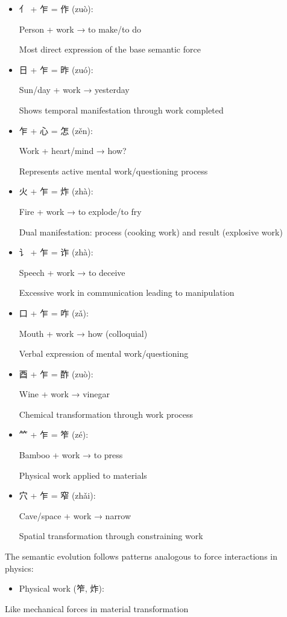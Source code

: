 \documentclass[
  11pt,
  letterpaper,
]{article}
\providecommand{\tightlist}{%
  \setlength{\itemsep}{0pt}\setlength{\parskip}{0pt}}
\begin{document}
\begin{itemize}
\item
  亻 + 乍 = 作 (zuò):

  Person + work → to make/to do

  Most direct expression of the base semantic force
\item
  日 + 乍 = 昨 (zuó):

  Sun/day + work → yesterday

  Shows temporal manifestation through work completed
\item
  乍 + 心 = 怎 (zěn):

  Work + heart/mind → how?

  Represents active mental work/questioning process
\item
  火 + 乍 = 炸 (zhà):

  Fire + work → to explode/to fry

  Dual manifestation: process (cooking work) and result (explosive work)
\item
  讠 + 乍 = 诈 (zhà):

  Speech + work → to deceive

  Excessive work in communication leading to manipulation
\item
  口 + 乍 = 咋 (zǎ):

  Mouth + work → how (colloquial)

  Verbal expression of mental work/questioning
\item
  酉 + 乍 = 酢 (zuò):

  Wine + work → vinegar

  Chemical transformation through work process
\item
  ⺮ + 乍 = 笮 (zé):

  Bamboo + work → to press

  Physical work applied to materials
\item
  穴 + 乍 = 窄 (zhǎi):

  Cave/space + work → narrow

  Spatial transformation through constraining work
\end{itemize}

The semantic evolution follows patterns analogous to force interactions
in physics:

\begin{itemize}
\tightlist
\item
  Physical work (笮, 炸):
\end{itemize}

Like mechanical forces in material transformation
\end{document}
